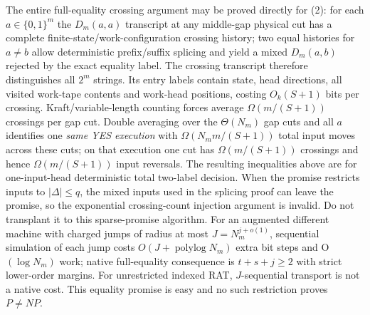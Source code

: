 \documentclass[11pt]{article}
\begin{document}
The entire full-equality crossing argument may be proved directly for (2): for each $a\in\{0,1\}^m$ the $D_m(a,a)$ transcript at any middle-gap physical cut has a complete finite-state/work-configuration crossing history; two equal histories for $a\ne b$ allow deterministic prefix/suffix splicing and yield a mixed $D_m(a,b)$ rejected by the exact equality label. The crossing transcript therefore distinguishes all $2^m$ strings. Its entry labels contain state, head directions, all visited work-tape contents and work-head positions, costing $O_k(S+1)$ bits per crossing. Kraft/variable-length counting forces average $\Omega(m/(S+1))$ crossings per gap cut. Double averaging over the $\Theta(N_m)$ gap cuts and all $a$ identifies one \emph{same YES execution} with $\Omega(N_mm/(S+1))$ total input moves across these cuts; on that execution one cut has $\Omega(m/(S+1))$ crossings and hence $\Omega(m/(S+1))$ input reversals. The resulting inequalities above are for one-input-head deterministic total two-label decision. When the promise restricts inputs to $|\Delta|\le q$, the mixed inputs used in the splicing proof can leave the promise, so the exponential crossing-count injection argument is invalid. Do not transplant it to this sparse-promise algorithm.
For an augmented different machine with charged jumps of radius at most $J=N_m^{j+o(1)}$, sequential simulation of each jump costs $O(J+\operatorname{polylog}N_m)$ extra bit steps and O$(\log N_m)$ work; native full-equality consequence is $t+s+j\ge2$ with strict lower-order margins. For unrestricted indexed RAT, $J$-sequential transport is not a native cost. This equality promise is easy and no such restriction proves $P\ne NP$.
\end{document}
